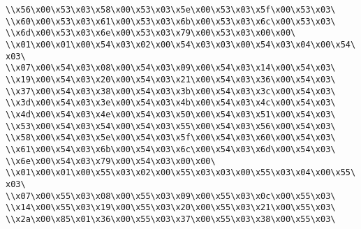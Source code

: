 \verb|\\x56\x00\x53\x03\x58\x00\x53\x03\x5e\x00\x53\x03\x5f\x00\x53\x03\|\newline
\verb|\\x60\x00\x53\x03\x61\x00\x53\x03\x6b\x00\x53\x03\x6c\x00\x53\x03\|\newline
\verb|\\x6d\x00\x53\x03\x6e\x00\x53\x03\x79\x00\x53\x03\x00\x00\|\newline
\verb|\\x01\x00\x01\x00\x54\x03\x02\x00\x54\x03\x03\x00\x54\x03\x04\x00\x54\x03\|\newline
\verb|\\x07\x00\x54\x03\x08\x00\x54\x03\x09\x00\x54\x03\x14\x00\x54\x03\|\newline
\verb|\\x19\x00\x54\x03\x20\x00\x54\x03\x21\x00\x54\x03\x36\x00\x54\x03\|\newline
\verb|\\x37\x00\x54\x03\x38\x00\x54\x03\x3b\x00\x54\x03\x3c\x00\x54\x03\|\newline
\verb|\\x3d\x00\x54\x03\x3e\x00\x54\x03\x4b\x00\x54\x03\x4c\x00\x54\x03\|\newline
\verb|\\x4d\x00\x54\x03\x4e\x00\x54\x03\x50\x00\x54\x03\x51\x00\x54\x03\|\newline
\verb|\\x53\x00\x54\x03\x54\x00\x54\x03\x55\x00\x54\x03\x56\x00\x54\x03\|\newline
\verb|\\x58\x00\x54\x03\x5e\x00\x54\x03\x5f\x00\x54\x03\x60\x00\x54\x03\|\newline
\verb|\\x61\x00\x54\x03\x6b\x00\x54\x03\x6c\x00\x54\x03\x6d\x00\x54\x03\|\newline
\verb|\\x6e\x00\x54\x03\x79\x00\x54\x03\x00\x00\|\newline
\verb|\\x01\x00\x01\x00\x55\x03\x02\x00\x55\x03\x03\x00\x55\x03\x04\x00\x55\x03\|\newline
\verb|\\x07\x00\x55\x03\x08\x00\x55\x03\x09\x00\x55\x03\x0c\x00\x55\x03\|\newline
\verb|\\x14\x00\x55\x03\x19\x00\x55\x03\x20\x00\x55\x03\x21\x00\x55\x03\|\newline
\verb|\\x2a\x00\x85\x01\x36\x00\x55\x03\x37\x00\x55\x03\x38\x00\x55\x03\|\newline

